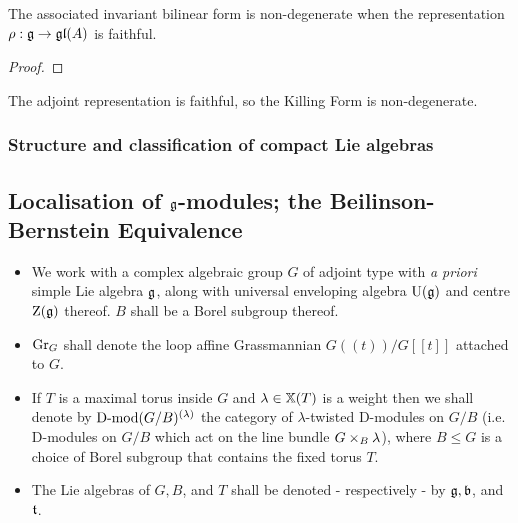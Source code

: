                     \begin{theorem} \label{theorem: nondegeneracy_of_associated_invariant_bilinear_forms_of_lie_algebras}
                        The associated invariant bilinear form is non-degenerate when the representation $\rho: \mathfrak{g} \to \mathfrak{gl}(A)$ is faithful.
                    \end{theorem}
                        \begin{proof}
                            
                        \end{proof}
                    \begin{corollary}
                        The adjoint representation is faithful, so the Killing Form is non-degenerate. 
                    \end{corollary}
                    
            \subsubsection{Structure and classification of compact Lie algebras}
    
        \subsection{Localisation of \texorpdfstring{$\mathfrak{g}$}{}-modules; the Beilinson-Bernstein Equivalence}
            \begin{convention} \label{conv: beilinson_bernstein_localisation_conventions}
                \noindent
                \begin{itemize}
                    \item We work with a complex algebraic group $G$ of adjoint type with \textit{a priori} simple Lie algebra $\mathfrak{g}$, along with universal enveloping algebra $\mathrm{U}(\mathfrak{g})$ and centre $\mathrm{Z}(\mathfrak{g})$ thereof. $B$ shall be a Borel subgroup thereof. 
                    \item $\mathrm{Gr}_G$ shall denote the loop affine Grassmannian $G(\!(t)\!)/G[\![t]\!]$ attached to $G$.
                    \item If $T$ is a maximal torus inside $G$ and $\lambda \in \mathbb{X}(T)$ is a weight then we shall denote by $\mathrm{D}\text{-}\mathrm{mod}(G/B)^{(\lambda)}$ the category of $\lambda$-twisted D-modules on $G/B$ (i.e. D-modules on $G/B$ which act on the line bundle $G \x_B \lambda$), where $B \leq G$ is a choice of Borel subgroup that contains the fixed torus $T$.
                    \item The Lie algebras of $G, B$, and $T$ shall be denoted - respectively - by $\mathfrak{g}, \mathfrak{b}$, and $\mathfrak{t}$.
                \end{itemize}
            \end{convention}
            
